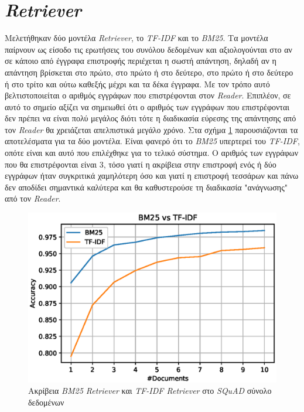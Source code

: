 \section{\emph{Retriever}}
\label{sec:retriever_exp}
Μελετήθηκαν δύο μοντέλα \emph{Retriever}, το \emph{TF-IDF} και το \emph{BM25}. Τα μοντέλα παίρνουν ως είσοδο τις ερωτήσεις του συνόλου δεδομένων και αξιολογούνται στο αν σε κάποιο από έγγραφα επιστροφής περιέχεται η σωστή απάντηση, δηλαδή αν η απάντηση βρίσκεται στο πρώτο, στο πρώτο ή στο δεύτερο, στο πρώτο ή στο δεύτερο ή στο τρίτο και ούτω καθεξής μέχρι και τα δέκα έγγραφα. Με τον τρόπο αυτό βελτιστοποιείται ο αριθμός εγγράφων που επιστρέφονται στον \emph{Reader}. Επιπλέον, σε αυτό το σημείο αξίζει να σημειωθεί ότι ο αριθμός των εγγράφων που επιστρέφονται δεν πρέπει να είναι πολύ μεγάλος διότι τότε η διαδικασία εύρεσης της απάντησης από τον \emph{Reader} θα χρειάζεται απελπιστικά μεγάλο χρόνο.
Στα σχήμα \ref{bm25-acc} παρουσιάζονται τα αποτελέσματα για τα δύο μοντέλα. Είναι φανερό ότι το \emph{BM25} υπερτερεί του \emph{TF-IDF}, οπότε είναι και αυτό που επιλέχθηκε για το τελικό σύστημα. Ο αριθμός των εγγράφων που θα επιστρέφονται είναι $3$, τόσο γιατί η ακρίβεια στην επιστροφή ενός ή δύο εγγράφων ήταν συγκριτικά χαμηλότερη όσο και γιατί η επιστροφή τεσσάρων και πάνω δεν αποδίδει σημαντικά καλύτερα και θα καθυστερούσε τη διαδικασία "ανάγνωσης" από τον \emph{Reader}.


\begin{figure}[htb]
  \centering
  \includegraphics[width=\linewidth]{figures/chapter6/test.eps}
  \caption{Ακρίβεια \emph{BM25 Retriever} και \emph{TF-IDF Retriever} στο \emph{SQuAD} σύνολο δεδομένων}
  \label{bm25-acc}
\end{figure}

